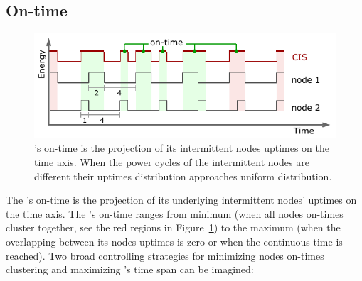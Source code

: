 \subsection{On-time}
%
\begin{figure}[t]
		\centering
		\includegraphics[width=\columnwidth]{figures/cisOntime}
		\caption{\fullsys's on-time is the projection of its intermittent nodes uptimes on the time axis. When the power cycles of the intermittent nodes are different their uptimes distribution approaches uniform distribution.}
		\label{fig:cisOntime}
\end{figure} 
%
The \sys's on-time is the projection of its underlying intermittent nodes' uptimes on the time axis. The \sys's on-time ranges from minimum (when all nodes on-times cluster together, see the red regions in Figure~\ref{fig:cisOntime}) to the maximum (when the overlapping between its nodes uptimes is zero or when the continuous time is reached). Two broad controlling strategies for minimizing nodes on-times clustering and maximizing \sys's time span can be imagined: 
